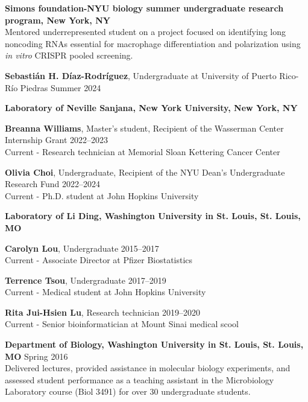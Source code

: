 \documentclass[letterpaper,11pt]{cv}
\begin{document}
\begin{entrylist}
\raggedright
\item \textbf{Simons foundation-NYU biology summer undergraduate research program, New York, NY}\\  
{\small Mentored underrepresented student on a project focused on identifying long noncoding RNAs essential for macrophage differentiation and polarization using \textit{in vitro} CRISPR pooled screening.}
\begin{detaillist}
    \item \textbf{Sebastián H. Díaz-Rodríguez}, Undergraduate at University of Puerto Rico-Río Piedras \hfill Summer 2024 \\
\end{detaillist}
\item \textbf{Laboratory of Neville Sanjana, New York University, New York, NY}\\
    \begin{detaillist}
       \item \textbf{Breanna Williams}, Master's student, Recipient of the Wasserman Center Internship Grant \hfill 2022--2023\\
       Current - Research technician at Memorial Sloan Kettering Cancer Center
       \item \textbf{Olivia Choi}, Undergraduate, Recipient of the NYU Dean's Undergraduate Research Fund \hfill 2022--2024\\
       Current - Ph.D. student at John Hopkins University
    \end{detaillist}
\item \textbf{Laboratory of Li Ding, Washington University in St. Louis, St. Louis, MO}\\
    \begin{detaillist}
    \item \textbf{Carolyn Lou}, Undergraduate  \hfill 2015--2017\\
    Current - Associate Director at Pfizer Biostatistics
    \item \textbf{Terrence Tsou}, Undergraduate  \hfill 2017--2019\\
    Current - Medical student at John Hopkins University
    \item \textbf{Rita Jui-Hsien Lu}, Research technician \hfill 2019--2020\\
    Current - Senior bioinformatician at Mount Sinai medical scool
    \end{detaillist}
\item \textbf{Department of Biology, Washington University in St. Louis, St. Louis, MO} \hfill Spring 2016 \\
    {\small Delivered lectures, provided assistance in molecular biology experiments, and assessed student performance as a teaching assistant in the Microbiology Laboratory course (Biol 3491) for over 30 undergraduate students.}
\end{entrylist}
\end{document}
